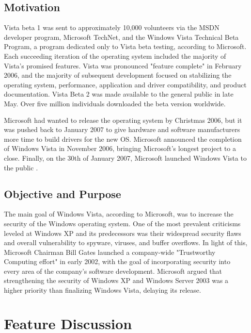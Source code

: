 \documentclass[a4paper, 12pt]{article}
\begin{document}
\subsection{Motivation}
Vista beta 1 was sent to approximately 10,000 volunteers via the MSDN developer program, Microsoft TechNet, and the Windows Vista Technical Beta Program, a program dedicated only to Vista beta testing, according to Microsoft. Each succeeding iteration of the operating system included the majority of Vista's promised features. Vista was pronounced "feature complete" in February 2006, and the majority of subsequent development focused on stabilizing the operating system, performance, application and driver compatibility, and product documentation. Vista Beta 2 was made available to the general public in late May. Over five million individuals downloaded the beta version worldwide.

Microsoft had wanted to release the operating system by Christmas 2006, but it was pushed back to January 2007 to give hardware and software manufacturers more time to build drivers for the new OS. Microsoft announced the completion of Windows Vista in November 2006, bringing Microsoft's longest project to a close. Finally, on the 30th of January 2007, Microsoft launched Windows Vista to the public \parencite{awusi2007evaluation}.


\subsection{Objective and Purpose}
The main goal of Windows Vista, according to Microsoft, was to increase the security of the Windows operating system. One of the most prevalent criticisms leveled at Windows XP and its predecessors was their widespread security flaws and overall vulnerability to spyware, viruses, and buffer overflows. In light of this, Microsoft Chairman Bill Gates launched a company-wide "Trustworthy Computing effort" in early 2002, with the goal of incorporating security into every area of the company's software development. Microsoft argued that strengthening the security of Windows XP and Windows Server 2003 was a higher priority than finalizing Windows Vista, delaying its release.
\newpage

\section{Feature Discussion}

\end{document}
